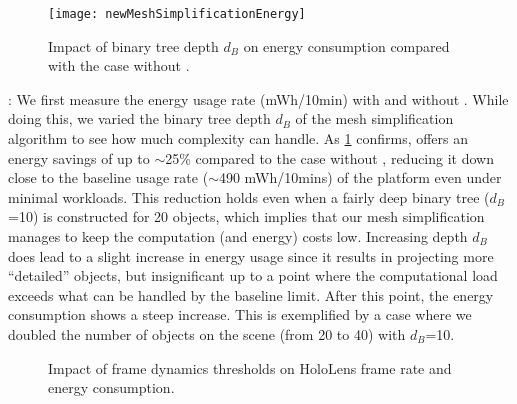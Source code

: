 

\begin{figure}
    \centering
    \vspace{-1ex}
    \texttt{[image: newMeshSimplificationEnergy]}
    \vspace{-2ex}
    \caption{Impact of binary tree depth $d_B$ on energy 
            consumption compared with the case without {\myit}.}            
    \label{fig:meshsimplification-energy}
\end{figure}



:
%
We first measure the energy usage rate (mWh/10min) with and without {\myit}.
%
While doing this, we varied the binary tree depth $d_B$ of the mesh 
simplification algorithm to see how much complexity {\myit} can handle.
%
As \fig\ref{fig:meshsimplification-energy} confirms, {\myit} offers an energy
savings of up to $\sim$25\% compared to the case without {\myit}, reducing it
down close to the baseline usage rate ($\sim$490 mWh/10mins) of the 
platform even under minimal workloads.
%
This reduction holds even when a fairly deep binary tree ($d_B$=10) is 
constructed for 20 objects, which implies that our mesh simplification manages
to keep the computation (and energy) costs low.
%
Increasing depth $d_B$ does lead to a slight increase in energy usage since it
results in projecting more ``detailed'' objects, but insignificant up to a 
point where the computational load exceeds what can be handled by
the baseline limit. 
%
After this point, the energy consumption shows a steep increase. 
This is exemplified by a case where we doubled the number of objects on the 
scene (from 20 to 40) with $d_B$=10.

\begin{figure}[t]
    \centering
    \vspace{-2ex}
    \vspace{-2ex}
    \caption{Impact of frame dynamics thresholds on HoloLens frame rate and 
            energy consumption.}
    \label{fig:framedyanmics}
\end{figure}


